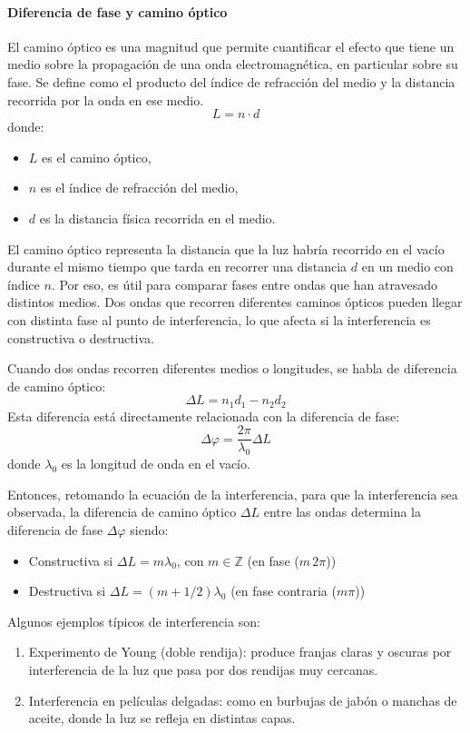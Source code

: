 \paragraph{Diferencia de fase y camino óptico}

El camino óptico es una magnitud que permite cuantificar el efecto que tiene un medio sobre la propagación de una onda electromagnética, en particular sobre su fase. Se define como el producto del índice de refracción del medio y la distancia recorrida por la onda en ese medio.
\[
L = n \cdot d
\]
donde:
\begin{itemize}
  \item $L$ es el camino óptico,
  \item $n$ es el índice de refracción del medio,
  \item $d$ es la distancia física recorrida en el medio.
\end{itemize}
El camino óptico representa la distancia que la luz habría recorrido en el vacío durante el mismo tiempo que tarda en recorrer una distancia \(d\) en un medio con índice \(n\). Por eso, es útil para comparar fases entre ondas que han atravesado distintos medios. Dos ondas que recorren diferentes caminos ópticos pueden llegar con distinta fase al punto de interferencia, lo que afecta si la interferencia es constructiva o destructiva.

Cuando dos ondas recorren diferentes medios o longitudes, se habla de diferencia de camino óptico:
\[
\Delta L = n_1 d_1 - n_2 d_2
\]
Esta diferencia está directamente relacionada con la diferencia de fase:
\[
\Delta \varphi = \frac{2\pi}{\lambda_0} \Delta L
\]
donde \(\lambda_0\) es la longitud de onda en el vacío.

Entonces, retomando la ecuación de la interferencia, para que la interferencia sea observada, la diferencia de camino óptico \(\Delta L\) entre las ondas determina la diferencia de fase \(\Delta \varphi\) siendo:
\begin{itemize}
  \item Constructiva si \(\Delta L = m \lambda_0\), con \(m \in \mathbb{Z}\) (en fase (\(m\,2\pi\)))
  \item Destructiva si \(\Delta L = (m + 1/2)\lambda_0\) (en fase contraria (\(m\pi\)))
\end{itemize}
Algunos ejemplos típicos de interferencia son:
\begin{enumerate}
  \item Experimento de Young (doble rendija): produce franjas claras y oscuras por interferencia de la luz que pasa por dos rendijas muy cercanas.
  \item Interferencia en películas delgadas: como en burbujas de jabón o manchas de aceite, donde la luz se refleja en distintas capas.
\end{enumerate}

